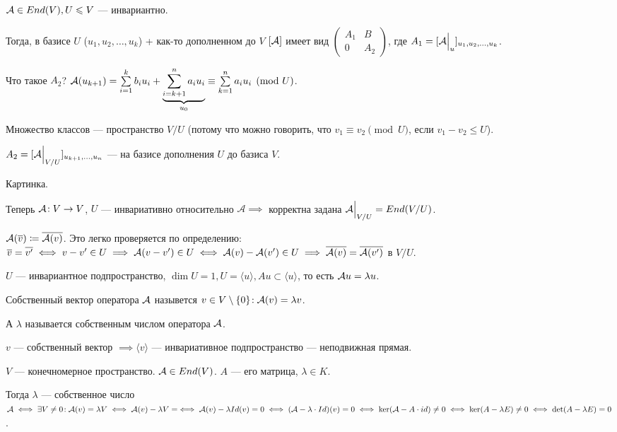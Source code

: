 \begin{statement}
    $\mathcal{A} \in End(V), U \leqslant V$ --- инвариантно.

    Тогда, в базисе $U$ ($u_1, u_2,\ldots, u_k$) + как-то дополненном до  $V$  $[\mathcal{A}]$ имеет вид $\left(\begin{array}{c|c} A_1 & B \\ \hline 0 & A_2 \end{array} \right)$, где  $A_1 = [\mathcal{A} \Big|_u]_{u_1, u_2, \ldots, u_k}$.

    Что такое $A_2$?  $\mathcal{A}(u_{k+1}) = \sum\limits_{i=1}^k b_i u_i + \underbrace{\sum\limits_{i=k+1}^n a_iu_i}_{u_0} \equiv \sum\limits_{k=1}^n a_i u_i \pmod U$.

    Множество классов --- пространство  $V / U$ (потому что можно говорить, что $v_1 \equiv v_2 \pmod U$, если $v_1 - v_2 \le U$).

    $A_2 = [\mathcal{A} \Big|_{V / U}]_{u_{k+1}, \ldots, u_n}$ --- на базисе дополнения $U$ до базиса  $V$.
\end{statement}
\begin{example}
Картинка.

\end{example}

Теперь $\mathcal{A}\!: V \to V$,  $U$ --- инвариативно относительно  $\mathcal{A} \implies $ корректна задана $\mathcal{A} \Big|_{V / U} = End(V / U)$. 

$\mathcal{A}(\overline{v}) \coloneqq \overline{\mathcal{A}(v)}$. Это легко проверяется по определению:  $\overline{v} = \overline{v'} \iff v - v' \in U \implies \mathcal{A}(v - v') \in U \iff \mathcal{A}(v) - \mathcal{A}(v') \in U \implies \overline{\mathcal{A}(v)} = \overline{\mathcal{A}(v')}$ в  $V / U$.

$U$ --- инвариантное подпространство,  $\dim U = 1, U = \langle u \rangle, Au \subset \langle u \rangle$, то есть $\mathcal{A} u = \lambda u$.

\begin{definition}
    Собственный вектор оператора $\mathcal{A}$ назывется $v \in V \setminus \{0\}\!: \mathcal{A}(v) = \lambda v$.

    А $\lambda$ называется собственным числом оператора $\mathcal{A}$.

    $v$ --- собственный вектор  $\implies \langle v \rangle$ --- инвариативное подпространство --- неподвижная прямая.
\end{definition}

    $V$ --- конечномерное пространство. $\mathcal{A} \in End(V)$.  $A$ --- его матрица,  $\lambda \in K$.

    Тогда $\lambda$ --- собственное число  $\mathcal{A} \iff \exists V \neq 0\!: \mathcal{A}(v) = \lambda V \iff \mathcal{A}(v) - \lambda V = \iff \mathcal{A}(v) - \lambda Id(v) = 0 \iff (\mathcal{A} - \lambda \cdot Id)(v) = 0 \iff \ker (\mathcal{A} - A \cdot id) \neq 0 \iff \ker (A - \lambda E) \neq 0 \iff \det (A - \lambda E) = 0$.

